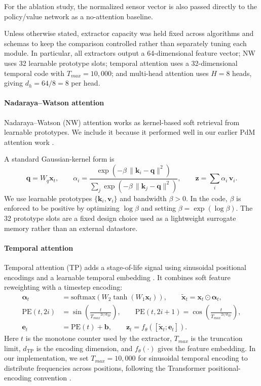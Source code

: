 \documentclass[sn-basic]{sn-jnl}%
\begin{document}
For the ablation study, the normalized sensor vector is also passed directly to the policy/value network as a no-attention baseline.

Unless otherwise stated, extractor capacity was held fixed across algorithms and schemas to keep the comparison controlled rather than separately tuning each module. In particular, all extractors output a 64-dimensional feature vector; NW uses 32 learnable prototype slots; temporal attention uses a 32-dimensional temporal code with $T_{max}=10{,}000$; and multi-head attention uses $H=8$ heads, giving $d_h=64/8=8$ per head.

\paragraph{Nadaraya--Watson attention}
Nadaraya--Watson (NW) attention works as kernel-based soft retrieval from learnable prototypes. We include it because it performed well in our earlier PdM attention work \cite{Siraskar2024}.

A standard Gaussian-kernel form is
\begin{equation}
        \mathbf{q}=W_q\mathbf{x}_t,\qquad
        \alpha_i = \frac{\exp\left(-\beta\,\lVert \mathbf{k}_i-\mathbf{q}\rVert^2\right)}{\sum_j \exp\left(-\beta\,\lVert \mathbf{k}_j-\mathbf{q}\rVert^2\right)},
        \qquad \mathbf{z}=\sum_i\alpha_i\,\mathbf{v}_i.
\end{equation}
We use learnable prototypes $\{\mathbf{k}_i,\mathbf{v}_i\}$ and bandwidth $\beta>0$. In the code, $\beta$ is enforced to be positive by optimizing $\log \beta$ and setting $\beta=\exp(\log \beta)$. The 32 prototype slots are a fixed design choice used as a lightweight surrogate memory rather than an external datastore.

\paragraph{Temporal attention}
Temporal attention (TP) adds a stage-of-life signal using sinusoidal positional encodings and a learnable temporal embedding \cite{Vaswani2017, Lim2020TFT}. It combines soft feature reweighting with a timestep encoding:
\begin{align}
        \boldsymbol{\alpha}_t &= \mathrm{softmax}\!\left(W_2\tanh\!\left(W_1\mathbf{x}_t\right)\right),
        \qquad \tilde{\mathbf{x}}_t = \mathbf{x}_t\odot\boldsymbol{\alpha}_t,\\
        \mathrm{PE}(t,2i) &= \sin\!\left(\frac{t}{{T_{max}}^{2i/d_{\mathrm{TP}}}}\right),
        \qquad \mathrm{PE}(t,2i+1)=\cos\!\left(\frac{t}{{T_{max}}^{2i/d_{\mathrm{TP}}}}\right),\\
        \mathbf{e}_t &= \mathrm{PE}(t) + \mathbf{b},
        \qquad \mathbf{z}_t = f_\theta\!\left([\tilde{\mathbf{x}}_t;\mathbf{e}_t]\right).
\end{align}
Here $t$ is the monotone counter used by the extractor, $T_{max}$ is the truncation limit, $d_{\mathrm{TP}}$ is the encoding dimension, and $f_\theta(\cdot)$ gives the feature embedding. In our implementation, we set $T_{max}=10{,}000$ for sinusoidal temporal encoding to distribute frequencies across positions, following the Transformer positional-encoding convention \cite{Vaswani2017}.
\end{document}
